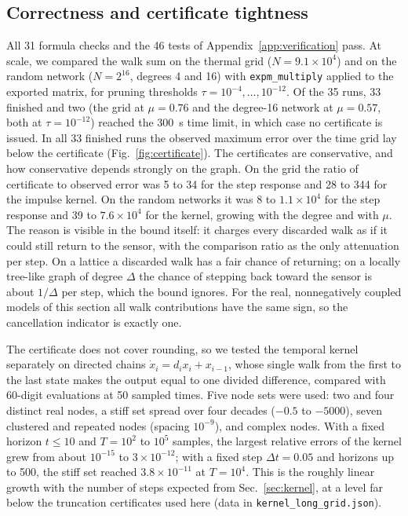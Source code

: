 \documentclass[aps,pra,superscriptaddress,floatfix,longbibliography,twocolumn]{revtex4-2}
\begin{document}
\subsection{Correctness and certificate tightness}\label{sec:accuracy}
All 31 formula checks and the 46 tests of Appendix~\ref{app:verification} pass. At scale, we compared the walk sum on the thermal grid ($N=9.1\times10^4$) and on the random network ($N=2^{16}$, degrees 4 and 16) with \texttt{expm\_multiply} applied to the exported matrix, for pruning thresholds $\tau=10^{-4},\dots,10^{-12}$. Of the 35 runs, 33 finished and two (the grid at $\mu=0.76$ and the degree-16 network at $\mu=0.57$, both at $\tau=10^{-12}$) reached the 300~s time limit, in which case no certificate is issued. In all 33 finished runs the observed maximum error over the time grid lay below the certificate (Fig.~\ref{fig:certificate}). The certificates are conservative, and how conservative depends strongly on the graph. On the grid the ratio of certificate to observed error was 5 to 34 for the step response and 28 to 344 for the impulse kernel. On the random networks it was 8 to $1.1\times10^4$ for the step response and 39 to $7.6\times10^4$ for the kernel, growing with the degree and with $\mu$. The reason is visible in the bound itself: it charges every discarded walk as if it could still return to the sensor, with the comparison ratio as the only attenuation per step. On a lattice a discarded walk has a fair chance of returning; on a locally tree-like graph of degree $\Delta$ the chance of stepping back toward the sensor is about $1/\Delta$ per step, which the bound ignores. For the real, nonnegatively coupled models of this section all walk contributions have the same sign, so the cancellation indicator is exactly one.

The certificate does not cover rounding, so we tested the temporal kernel separately on directed chains $\dot x_i=d_ix_i+x_{i-1}$, whose single walk from the first to the last state makes the output equal to one divided difference, compared with 60-digit evaluations at 50 sampled times. Five node sets were used: two and four distinct real nodes, a stiff set spread over four decades ($-0.5$ to $-5000$), seven clustered and repeated nodes (spacing $10^{-9}$), and complex nodes. With a fixed horizon $t\le10$ and $T=10^2$ to $10^5$ samples, the largest relative errors of the kernel grew from about $10^{-15}$ to $3\times10^{-12}$; with a fixed step $\Delta t=0.05$ and horizons up to 500, the stiff set reached $3.8\times10^{-11}$ at $T=10^4$. This is the roughly linear growth with the number of steps expected from Sec.~\ref{sec:kernel}, at a level far below the truncation certificates used here (data in \texttt{kernel\_long\_grid.json}).
\end{document}
